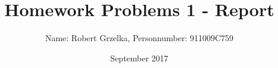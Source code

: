 \documentclass{report}
\begin{document}
\title{Homework Problems 1 - Report}
\author{Name: Robert Grzelka, Personnumber: 911009C759}
\date{September 2017}

\maketitle
 
\tableofcontents




\end{document}
